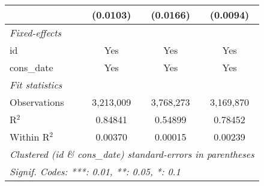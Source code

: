 \begin{tabular}{lccc}
                                                             & (0.0103)        & (0.0166)       & (0.0094)\\
   \midrule \emph{Fixed-effects} &   &   &  \\
   id                                                        & Yes             & Yes            & Yes\\
   cons\_date                                               & Yes             & Yes            & Yes\\
   \midrule \emph{Fit statistics} &   &   &  \\
   Observations                                              & 3,213,009       & 3,768,273      & 3,169,870\\
   R$^2$                                                     & 0.84841         & 0.54899        & 0.78452\\
   Within R$^2$                                              & 0.00370         & 0.00015        & 0.00239\\
   \midrule\midrule\multicolumn{4}{l}{\emph{Clustered (id \& cons\_date) standard-errors in parentheses}}\\
   \multicolumn{4}{l}{\emph{Signif. Codes: ***: 0.01, **: 0.05, *: 0.1}}\\
\end{tabular}



